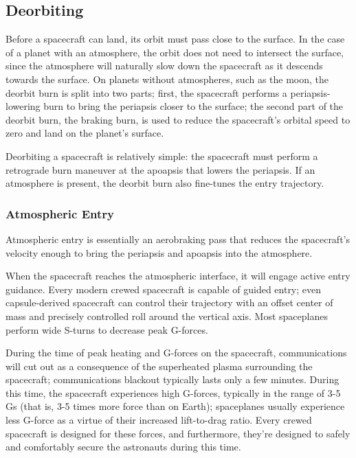 \subsection{Deorbiting}
\label{subsec:deorbiting}

Before a spacecraft can land, its orbit must pass close to the
surface. In the case of a planet with an atmosphere, the orbit does
not need to intersect the surface, since the atmosphere will naturally
slow down the spacecraft as it descends towards the surface. On
planets without atmospheres, such as the moon, the deorbit burn is
split into two parts; first, the spacecraft performs a
periapsis-lowering burn to bring the periapsis closer to the surface;
the second part of the deorbit burn, the braking burn, is used to
reduce the spacecraft's orbital speed to zero and land on the planet's
surface.

Deorbiting a spacecraft is relatively simple: the spacecraft must
perform a retrograde burn maneuver at the apoapsis that lowers the
periapsis. If an atmosphere is present, the deorbit burn also
fine-tunes the entry trajectory.

\subsubsection{Atmospheric Entry}
\label{subsubsec:atmospheric-entry}

Atmospheric entry is essentially an aerobraking pass that reduces the
spacecraft's velocity enough to bring the periapsis and apoapsis into
the atmosphere.


When the spacecraft reaches the atmospheric interface, it will engage
active entry guidance. Every modern crewed spacecraft is capable of
guided entry; even capsule-derived spacecraft can control their
trajectory with an offset center of mass and precisely controlled roll
around the vertical axis. Most spaceplanes perform wide S-turns to
decrease peak G-forces.


\illustrationsoon

During the time of peak heating and G-forces on the spacecraft,
communications will cut out as a consequence of the superheated plasma
surrounding the spacecraft; communications blackout typically lasts
only a few minutes. During this time, the spacecraft experiences high
G-forces, typically in the range of 3-5 Gs (that is, 3-5 times more
force than on Earth); spaceplanes usually experience less G-force as a
virtue of their increased lift-to-drag ratio. Every crewed spacecraft
is designed for these forces, and furthermore, they're designed to
safely and comfortably secure the astronauts during this time.

